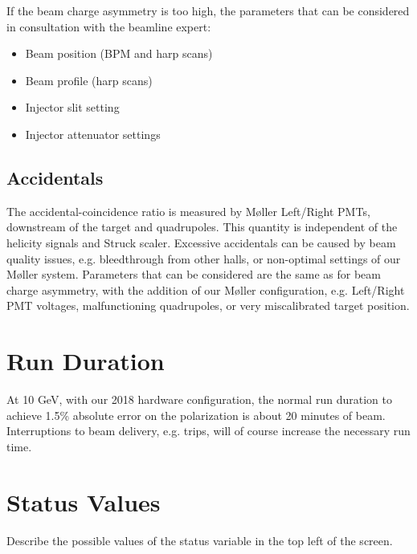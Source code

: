 \documentclass[amsmath,amssymb,notitlepage,12pt]{revtex4}
\begin{document}
If the beam charge asymmetry is too high, the parameters that can be considered in consultation with the beamline expert:
\begin{itemize}
\vspace{-4mm}\item Beam position (BPM and harp scans)
\vspace{-4mm}\item Beam profile (harp scans)
\vspace{-4mm}\item Injector slit setting
\vspace{-4mm}\item Injector attenuator settings
\end{itemize}

\subsection{Accidentals}
The accidental-coincidence ratio is measured by M{\o}ller Left/Right PMTs, downstream of the target and quadrupoles.  This quantity is independent of the helicity signals and Struck scaler.  Excessive accidentals can be caused by beam quality issues, e.g. bleedthrough from other halls, or non-optimal settings of our M{\o}ller system.  Parameters that can be considered are the same as for beam charge asymmetry, with the addition of our M{\o}ller configuration, e.g. Left/Right PMT voltages, malfunctioning quadrupoles, or very miscalibrated target position.

\newpage
\section{Run Duration}
At 10 GeV, with our 2018 hardware configuration, the normal run duration to achieve 1.5\% absolute error on the polarization is about 20 minutes of beam.  Interruptions to beam delivery, e.g. trips, will of course increase the necessary run time.

\section{Status Values}
Describe the possible values of the status variable in the top left of the screen.
\end{document}
